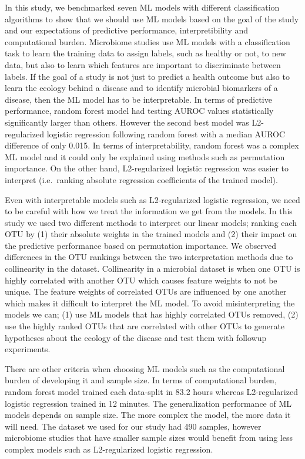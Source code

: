 \documentclass[11pt,]{article}
\begin{document}
In this study, we benchmarked seven ML models with different
classification algorithms to show that we should use ML models based on
the goal of the study and our expectations of predictive performance,
interpretibility and computational burden. Microbiome studies use ML
models with a classification task to learn the training data to assign
labels, such as healthy or not, to new data, but also to learn which
features are important to discriminate between labels. If the goal of a
study is not just to predict a health outcome but also to learn the
ecology behind a disease and to identify microbial biomarkers of a
disease, then the ML model has to be interpretable. In terms of
predictive performance, random forest model had testing AUROC values
statistically significantly larger than others. However the second best
model was L2-regularized logistic regression following random forest
with a median AUROC difference of only 0.015. In terms of
interpretability, random forest was a complex ML model and it could only
be explained using methods such as permutation importance. On the other
hand, L2-regularized logistic regression was easier to interpret
(i.e.~ranking absolute regression coefficients of the trained model).

Even with interpretable models such as L2-regularized logistic
regression, we need to be careful with how we treat the information we
get from the models. In this study we used two different methods to
interpret our linear models; ranking each OTU by (1) their absolute
weights in the trained models and (2) their impact on the predictive
performance based on permutation importance. We observed differences in
the OTU rankings between the two interpretation methods due to
collinearity in the dataset. Collinearity in a microbial dataset is when
one OTU is highly correlated with another OTU which causes feature
weights to not be unique. The feature weights of correlated OTUs are
influenced by one another which makes it difficult to interpret the ML
model. To avoid misinterpreting the models we can; (1) use ML models
that has highly correlated OTUs removed, (2) use the highly ranked OTUs
that are correlated with other OTUs to generate hypotheses about the
ecology of the disease and test them with followup experiments.

There are other criteria when choosing ML models such as the
computational burden of developing it and sample size. In terms of
computational burden, random forest model trained each data-split in
83.2 hours whereas L2-regularized logistic regression trained in 12
minutes. The generalization performance of ML models depends on sample
size. The more complex the model, the more data it will need. The
dataset we used for our study had 490 samples, however microbiome
studies that have smaller sample sizes would benefit from using less
complex models such as L2-regularized logistic regression.
\end{document}
